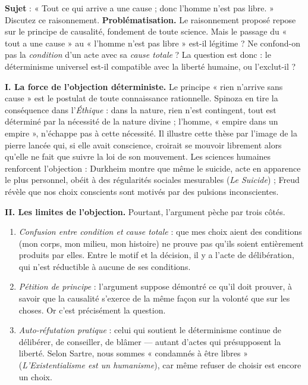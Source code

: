\documentclass[11pt]{article}
\begin{document}
\begin{exoresolu}
\textbf{Sujet} : « Tout ce qui arrive a une cause ; donc l'homme n'est pas libre. » Discutez ce raisonnement.
\tcblower
\textbf{Problématisation.} Le raisonnement proposé repose sur le principe de causalité, fondement de toute science. Mais le passage du « tout a une cause » au « l'homme n'est pas libre » est-il légitime ? Ne confond-on pas la \emph{condition} d'un acte avec sa \emph{cause totale} ? La question est donc : le déterminisme universel est-il compatible avec la liberté humaine, ou l'exclut-il ?

\textbf{I. La force de l'objection déterministe.}
Le principe « rien n'arrive sans cause » est le postulat de toute connaissance rationnelle. Spinoza en tire la conséquence dans l'\emph{Éthique} : dans la nature, rien n'est contingent, tout est déterminé par la nécessité de la nature divine ; l'homme, « empire dans un empire », n'échappe pas à cette nécessité. Il illustre cette thèse par l'image de la pierre lancée qui, si elle avait conscience, croirait se mouvoir librement alors qu'elle ne fait que suivre la loi de son mouvement. Les sciences humaines renforcent l'objection : Durkheim montre que même le suicide, acte en apparence le plus personnel, obéit à des régularités sociales mesurables (\emph{Le Suicide}) ; Freud révèle que nos choix conscients sont motivés par des pulsions inconscientes.

\textbf{II. Les limites de l'objection.}
Pourtant, l'argument pèche par trois côtés.
\begin{enumerate}
\item \emph{Confusion entre condition et cause totale} : que mes choix aient des conditions (mon corps, mon milieu, mon histoire) ne prouve pas qu'ils soient entièrement produits par elles. Entre le motif et la décision, il y a l'acte de délibération, qui n'est réductible à aucune de ses conditions.
\item \emph{Pétition de principe} : l'argument suppose démontré ce qu'il doit prouver, à savoir que la causalité s'exerce de la même façon sur la volonté que sur les choses. Or c'est précisément la question.
\item \emph{Auto-réfutation pratique} : celui qui soutient le déterminisme continue de délibérer, de conseiller, de blâmer — autant d'actes qui présupposent la liberté. Selon Sartre, nous sommes « condamnés à être libres » (\emph{L'Existentialisme est un humanisme}), car même refuser de choisir est encore un choix.
\end{enumerate}


\end{exoresolu}
\end{document}
